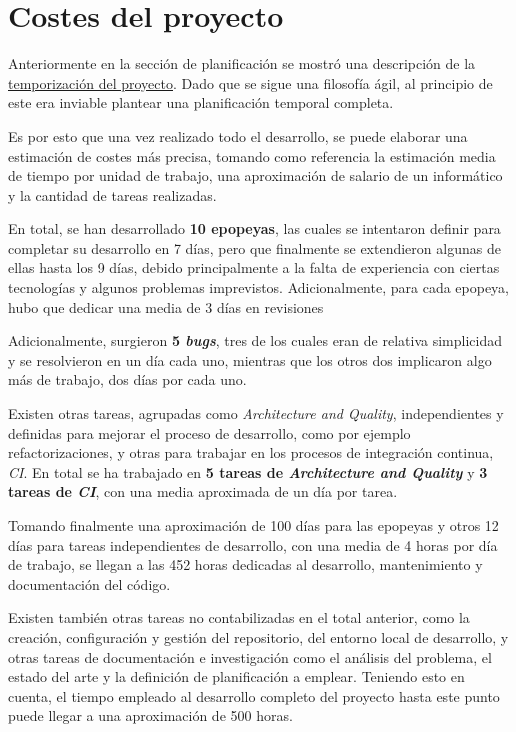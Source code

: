 \chapter{Costes del proyecto}

Anteriormente en la sección de planificación se mostró una descripción de la \hyperref[{TempSection}]{\underline{temporización del proyecto}}. Dado que se sigue una filosofía ágil, al principio de este era inviable plantear una planificación temporal completa.

Es por esto que una vez realizado todo el desarrollo, se puede elaborar una estimación de costes más precisa, tomando como referencia la estimación media de tiempo por unidad de trabajo, una aproximación de salario de un informático y la cantidad de tareas realizadas.

En total, se han desarrollado \textbf{10 epopeyas}, las cuales se intentaron definir para completar su desarrollo en 7 días, pero que finalmente se extendieron algunas de ellas hasta los 9 días, debido principalmente a la falta de experiencia con ciertas tecnologías y algunos problemas imprevistos. Adicionalmente, para cada epopeya, hubo que dedicar una media de 3 días en revisiones

Adicionalmente, surgieron \textbf{5 \textit{bugs}}, tres de los cuales eran de relativa simplicidad y se resolvieron en un día cada uno, mientras que los otros dos implicaron algo más de trabajo, dos días por cada uno.

Existen otras tareas, agrupadas como \textit{Architecture and Quality}, independientes y definidas para mejorar el proceso de desarrollo, como por ejemplo refactorizaciones, y otras para trabajar en los procesos de integración continua, \textit{CI}. En total se ha trabajado en \textbf{5 tareas de \textit{Architecture and Quality}} y \textbf{3 tareas de \textit{CI}}, con una media aproximada de un día por tarea.

Tomando finalmente una aproximación de 100 días para las epopeyas y otros 12 días para tareas independientes de desarrollo, con una media de 4 horas por día de trabajo, se llegan a las 452 horas dedicadas al desarrollo, mantenimiento y documentación del código.

Existen también otras tareas no contabilizadas en el total anterior, como la creación, configuración y gestión del repositorio, del entorno local de desarrollo, y otras tareas de documentación e investigación como el análisis del problema, el estado del arte y la definición de planificación a emplear. Teniendo esto en cuenta, el tiempo empleado al desarrollo completo del proyecto hasta este punto puede llegar a una aproximación de 500 horas.

